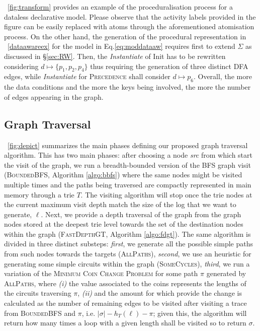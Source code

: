 \documentclass[sigconf]{acmart}
\begin{document}
\figurename~\ref{fig:transform} provides an example of the proceduralisation process for a dataless declarative model. Please observe that the activity labels provided in the figure can be easily replaced with atoms through the aforementioned atomisation process. On the other hand, the generation of the procedural representation in \figurename~\ref{dataawareex} for the model in Eq.\ref{eq:moddataaw} requires first to extend $\Sigma$ as discussed in \S\ref{sec:RW}. Then, the \textit{Instantiate} of \textsf{Init} has to be rewritten considering $d\mapsto \{p_1,p_2,p_4\}$ thus requiring the generation of three distinct DFA edges, while \textit{Instantiate} for \textsc{Precedence} shall consider $d\mapsto p_6$. Overall, the more the data conditions and the more the keys being involved, the more the number of edges appearing in the graph.






\subsection{Graph Traversal}\label{sec:gtrav}
\figurename~\ref{fig:depict} summarizes the main phases defining our proposed graph traversal algorithm. This has two main phases: after choosing a node \textit{src} from which start the visit of the graph, we run a breadth-bounded version of the BFS graph visit (\textsc{BoundedBFS}, Algorithm \ref{algo:bbfs}) where the same nodes might be visited multiple times and the paths being traversed are compactly represented in main memory through a trie $T$. The visiting algorithm will stop once the trie nodes at the current maximum visit depth match the size of the log that we want to generate, $\ell$.  Next, we provide a depth traversal of the graph from the graph nodes stored at the deepest trie level towards the set of the destination nodes within the graph (\textsc{FastDepthGT}, Algorithm \ref{algo:fdgt}). The same algorithm is divided in  three distinct substeps: \textit{first}, we generate all the possible simple paths from such nodes towards the targets (\textsc{AllPaths}), \textit{second}, we use an heuristic for generating some simple circuits within the graph (\textsc{SomeCycles}), \textit{third}, we run a variation of the \textsc{Minimum Coin Change Problem} for some path $\pi$ generated by \textsc{AllPaths}, where \textit{(i)} the value associated to the coins represents the lengths of the circuits traversing $\pi$, \textit{(ii)} and the amount for which provide  the change is calculated as the number of remaining edges to be visited after visiting a trace from \textsc{BoundedBFS} and $\pi$, i.e. $|\sigma|-h_{T}(\ell)-\pi$; given this, the algorithm will return how many times a loop with a given length shall be visited so to return $\sigma$.
\end{document}
